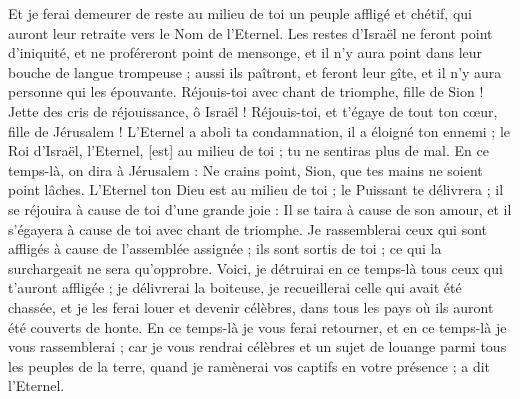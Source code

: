 \begin{multicols}{2}
Et je ferai demeurer de reste au milieu de toi un peuple affligé et chétif, qui auront leur retraite vers le Nom de l'Eternel.
Les restes d'Israël ne feront point d'iniquité, et ne proféreront point de mensonge, et il n'y aura point dans leur bouche de langue trompeuse ; aussi ils paîtront, et feront leur gîte, et il n'y aura personne qui les épouvante.
Réjouis-toi avec chant de triomphe, fille de Sion ! Jette des cris de réjouissance, ô Israël ! Réjouis-toi, et t'égaye de tout ton cœur, fille de Jérusalem !
L'Eternel a aboli ta condamnation, il a éloigné ton ennemi ; le Roi d'Israël, l'Eternel, [est] au milieu de toi ; tu ne sentiras plus de mal.
En ce temps-là, on dira à Jérusalem : Ne crains point, Sion, que tes mains ne soient point lâches.
L'Eternel ton Dieu est au milieu de toi ; le Puissant te délivrera ; il se réjouira à cause de toi d'une grande joie : Il se taira à cause de son amour, et il s'égayera à cause de toi avec chant de triomphe.
Je rassemblerai ceux qui sont affligés à cause de l'assemblée assignée ; ils sont sortis de toi ; ce qui la surchargeait ne sera qu'opprobre.
Voici, je détruirai en ce temps-là tous ceux qui t'auront affligée ; je délivrerai la boiteuse, je recueillerai celle qui avait été chassée, et je les ferai louer et devenir célèbres, dans tous les pays où ils auront été couverts de honte.
En ce temps-là je vous ferai retourner, et en ce temps-là je vous rassemblerai ; car je vous rendrai célèbres et un sujet de louange parmi tous les peuples de la terre, quand je ramènerai vos captifs en votre présence ; a dit l'Eternel.
\PPE{}
\end{multicols}
